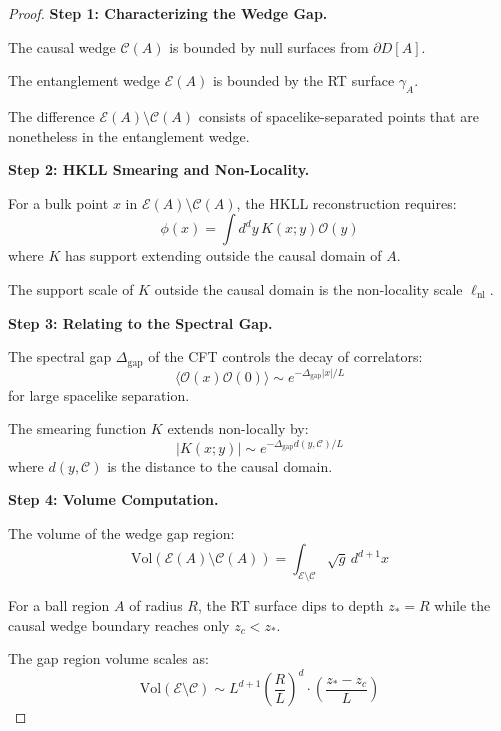 \documentclass[12pt,a4paper]{article}
\begin{document}
\begin{proof}
\textbf{Step 1: Characterizing the Wedge Gap.}

The causal wedge $\mathcal{C}(A)$ is bounded by null surfaces from $\partial D[A]$.

The entanglement wedge $\mathcal{E}(A)$ is bounded by the RT surface $\gamma_A$.

The difference $\mathcal{E}(A) \setminus \mathcal{C}(A)$ consists of spacelike-separated points that are nonetheless in the entanglement wedge.

\textbf{Step 2: HKLL Smearing and Non-Locality.}

For a bulk point $x$ in $\mathcal{E}(A) \setminus \mathcal{C}(A)$, the HKLL reconstruction requires:
\begin{equation}
\phi(x) = \int d^dy \, K(x; y) \mathcal{O}(y)
\end{equation}
where $K$ has support extending outside the causal domain of $A$.

The support scale of $K$ outside the causal domain is the non-locality scale $\ell_{\text{nl}}$.

\textbf{Step 3: Relating to the Spectral Gap.}

The spectral gap $\Delta_{\text{gap}}$ of the CFT controls the decay of correlators:
\begin{equation}
\langle \mathcal{O}(x)\mathcal{O}(0) \rangle \sim e^{-\Delta_{\text{gap}} |x|/L}
\end{equation}
for large spacelike separation.

The smearing function $K$ extends non-locally by:
\begin{equation}
|K(x; y)| \sim e^{-\Delta_{\text{gap}} d(y, \mathcal{C})/L}
\end{equation}
where $d(y, \mathcal{C})$ is the distance to the causal domain.

\textbf{Step 4: Volume Computation.}

The volume of the wedge gap region:
\begin{equation}
\text{Vol}(\mathcal{E}(A) \setminus \mathcal{C}(A)) = \int_{\mathcal{E} \setminus \mathcal{C}} \sqrt{g} \, d^{d+1}x
\end{equation}

For a ball region $A$ of radius $R$, the RT surface dips to depth $z_* = R$ while the causal wedge boundary reaches only $z_c < z_*$.

The gap region volume scales as:
\begin{equation}
\text{Vol}(\mathcal{E} \setminus \mathcal{C}) \sim L^{d+1} \left(\frac{R}{L}\right)^d \cdot \left(\frac{z_* - z_c}{L}\right)
\end{equation}


\end{proof}
\end{document}
